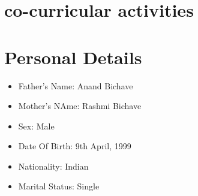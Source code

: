 \documentclass[10pt]{article}
\begin{document}
\section{co-curricular activities}



\section{Personal Details} 
\begin{itemize}

\item{Father's Name: Anand Bichave}
\item{Mother's NAme: Rashmi Bichave}
\item{Sex: Male}
\item{Date Of Birth: 9th April, 1999}
\item{Nationality: Indian}
\item{Marital Status: Single}

\end{itemize}
\end{document}
